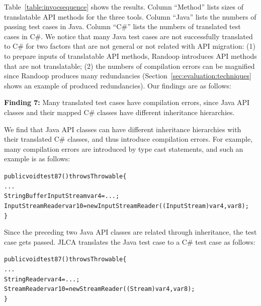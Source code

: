 Table~\ref{table:invocsequence} shows the results. Column ``Method'' lists sizes of translatable API methods for the three tools. Column ``Java'' lists the numbers of passing test cases in Java. Column ``C\#'' lists the numbers of translated test cases in C\#. We notice that many Java test cases are not successfully translated to C\# for two factors that are not general or not related with API migration: (1) to prepare inputs of translatable API methods, Randoop introduces API methods that are not translatable; (2) the numbers of compilation errors can be magnified since Randoop produces many redundancies (Section~\ref{sec:evaluation:techniques} shows an example of produced redundancies). Our findings are as follows:

\textbf{Finding 7:} Many translated test cases have compilation errors, since Java API classes and their mapped C\# classes have different inheritance hierarchies.

We find that Java API classes can have different inheritance hierarchies with their translated C\# classes, and thus introduce compilation errors. For example, many compilation errors are introduced by type cast statements, and such an example is as follows:

\begin{CodeOut}%
\begin{alltt}
public void test87() throws Throwable\{
  ...
  StringBufferInputStream var4 = ...;
  InputStreamReader var10 = new InputStreamReader((InputStream)var4, var8);
\}
\end{alltt}
\end{CodeOut}%

Since the preceding two Java API classes are related through inheritance, the test case gets passed. JLCA translates the Java test case to a C\# test case as follows:

\begin{CodeOut}%
\begin{alltt}
public void test87() throws Throwable\{
  ...
  StringReader var4 = ...;
  StreamReader var10 = new StreamReader((Stream)var4, var8);
\}
\end{alltt}
\end{CodeOut}%

